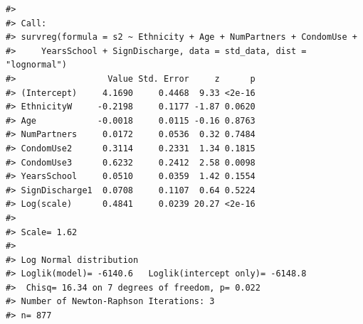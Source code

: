 \documentclass[
]{article}
\newenvironment{Shaded}{\begin{snugshade}}{\end{snugshade}}
\newcommand{\AttributeTok}[1]{\textcolor[rgb]{0.77,0.63,0.00}{#1}}
\newcommand{\FunctionTok}[1]{\textcolor[rgb]{0.00,0.00,0.00}{#1}}
\newcommand{\NormalTok}[1]{#1}
\newcommand{\OtherTok}[1]{\textcolor[rgb]{0.56,0.35,0.01}{#1}}
\newcommand{\SpecialCharTok}[1]{\textcolor[rgb]{0.00,0.00,0.00}{#1}}
\newcommand{\StringTok}[1]{\textcolor[rgb]{0.31,0.60,0.02}{#1}}
\begin{document}
\begin{Shaded}
\end{Shaded}

\begin{verbatim}
#> 
#> Call:
#> survreg(formula = s2 ~ Ethnicity + Age + NumPartners + CondomUse + 
#>     YearsSchool + SignDischarge, data = std_data, dist = "lognormal")
#>                  Value Std. Error     z      p
#> (Intercept)     4.1690     0.4468  9.33 <2e-16
#> EthnicityW     -0.2198     0.1177 -1.87 0.0620
#> Age            -0.0018     0.0115 -0.16 0.8763
#> NumPartners     0.0172     0.0536  0.32 0.7484
#> CondomUse2      0.3114     0.2331  1.34 0.1815
#> CondomUse3      0.6232     0.2412  2.58 0.0098
#> YearsSchool     0.0510     0.0359  1.42 0.1554
#> SignDischarge1  0.0708     0.1107  0.64 0.5224
#> Log(scale)      0.4841     0.0239 20.27 <2e-16
#> 
#> Scale= 1.62 
#> 
#> Log Normal distribution
#> Loglik(model)= -6140.6   Loglik(intercept only)= -6148.8
#>  Chisq= 16.34 on 7 degrees of freedom, p= 0.022 
#> Number of Newton-Raphson Iterations: 3 
#> n= 877
\end{verbatim}
\end{document}
